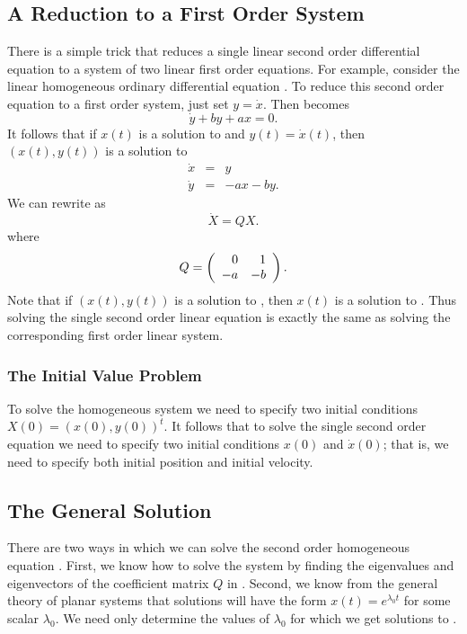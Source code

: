 \subsection*{A Reduction to a First Order System}

There is a simple trick that reduces a single linear second order
differential equation to a system of two linear first order equations.
For example, consider the linear homogeneous ordinary differential
equation .  To reduce this second order equation to a first order
system, just set $y=\dot{x}$.  Then  becomes
\[
\dot{y} + by + ax = 0.
\]
It follows that if $x(t)$ is a solution to  and
$y(t)=\dot{x}(t)$, then $(x(t),y(t))$ is a solution to
\begin{equation}  \label{e:soex1sys}
\begin{array}{rcl}
\dot{x} & = & y \\
\dot{y} & = & -ax - by.
\end{array}
\end{equation}
We can rewrite  as
\[
\dot{X} = Q X.
\]
where
\begin{equation}  \label{e:coeffmatQ}
Q =  \left(\begin{array}{rr} 0 & 1\\ -a &-b\end{array}\right).
\end{equation}
Note that if $(x(t),y(t))$ is a solution to , then
$x(t)$ is a solution to .  Thus solving the single
second order linear equation is exactly the same as solving the
corresponding first order linear system.

\subsubsection*{The Initial Value Problem}

To solve the homogeneous system  we need to specify
two initial conditions $X(0)=(x(0),y(0))^t$.  It follows that to
solve the single second order equation we need to specify two initial
conditions $x(0)$ and $\dot{x}(0)$; that is, we need to specify
both initial position and
initial velocity.

\subsection*{The General Solution}

There are two ways in which we can solve
the second order homogeneous equation .  First,
we know how to solve the system  by finding the
eigenvalues and eigenvectors of the coefficient matrix $Q$ in
.  Second, we know from the general theory of
planar systems that solutions will have the form $x(t)=e^{\lambda_0t}$
for some scalar $\lambda_0$.  We need only determine the values of
$\lambda_0$ for which we get solutions to .


